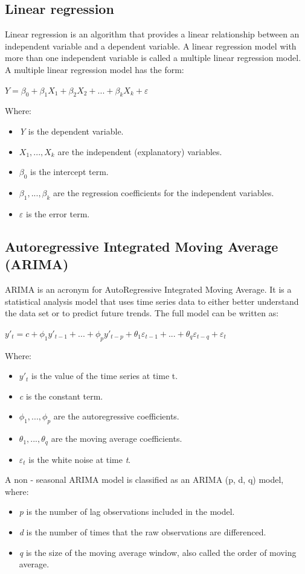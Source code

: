 \documentclass{ieeeojies}
\begin{document}
\subsection{Linear regression}
Linear regression is an algorithm that provides a linear relationship between an independent variable and a dependent variable. A linear regression model with more than one independent variable is called a multiple linear regression model. A multiple linear regression model has the form:
\newline  \centerline{$\textit{Y} = \beta_{0} + \beta_{1}X_{1} + \beta_{2}X_{2} + ... + \beta_{k}X_{k} + \varepsilon$}
\newline Where:
\begin{itemize}
	\item \textit{Y} is the dependent variable.
	\item $X_{1},...,X_{k}$ are the independent (explanatory) variables.
	\item $\beta_{0}$ is the intercept term.
	\item $\beta_{1},...,\beta_{k}$ are the regression coefficients for the independent variables.
	\item $\varepsilon$ is the error term.
\end{itemize}
\subsection{Autoregressive Integrated Moving Average (ARIMA)}
ARIMA is an acronym for AutoRegressive Integrated Moving Average. It is a statistical analysis model that uses time series data to either better understand the data set or to predict future trends. The full model can be written as:
\newline \centerline{$y'_{t} = c + \phi_{1}y'_{t-1} + ... + \phi_{p}y'_{t-p} + \theta_{1}\varepsilon_{t-1} + ... + \theta_{q}\varepsilon_{t-q} + \varepsilon_{t}$}
\newline Where:
\begin{itemize}
	\item $y'_{t}$ is the value of the time series at time t.
	\item \textit{c} is the constant term.
	\item $\phi_{1},...,\phi_{p}$ are the autoregressive coefficients.
	\item $\theta_{1},...,\theta_{q}$ are the moving average coefficients.
	\item $\varepsilon_{t}$ is the white noise at time \textit{t}.
\end{itemize}
A non - seasonal ARIMA model is classified as an ARIMA (p, d, q) model, where:
\begin{itemize}
	\item \textit{p} is the number of lag observations included in the model.
	\item \textit{d} is the number of times that the raw observations are differenced.
	\item \textit{q} is the size of the moving average window, also called the order of moving average.
\end{itemize}
\end{document}
